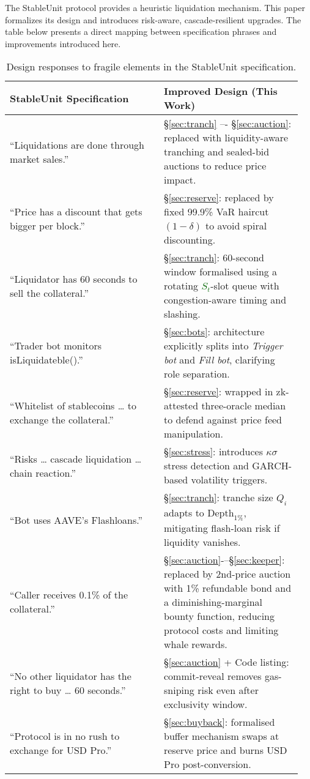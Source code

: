 \documentclass[11pt]{article}
\newcommand{\secref}[1]{\hyperref[#1]{\S\ref*{#1}}}
\begin{document}
The StableUnit protocol \parencite{stableunit2025spec} provides a heuristic liquidation mechanism. This paper formalizes its design and introduces risk-aware, cascade-resilient upgrades. The table below presents a direct mapping between specification phrases and improvements introduced here.
\begin{table}[ht]
\centering
\caption{Design responses to fragile elements in the StableUnit specification.}
\label{tab:trigger-map}

\begin{tabular}{@{}p{0.5\linewidth} p{0.45\linewidth}@{}}
\toprule
\textbf{StableUnit Specification} & \textbf{Improved Design (This Work)} \\
\midrule
“Liquidations are done through market sales.” & \secref{sec:tranch} –- \secref{sec:auction}: replaced with liquidity-aware tranching and sealed-bid auctions to reduce price impact. \\
“Price has a discount that gets bigger per block.” & \secref{sec:reserve}: replaced by fixed 99.9\% VaR haircut $(1 - \delta)$ to avoid spiral discounting. \\
“Liquidator has 60 seconds to sell the collateral.” & \secref{sec:tranch}: 60-second window formalised using a rotating \textcolor{darkgreen}{$S_{t}$}-slot queue with congestion-aware timing and slashing. \\
“Trader bot monitors isLiquidateble().” & \secref{sec:bots}: architecture explicitly splits into \textit{Trigger bot} and \textit{Fill bot}, clarifying role separation. \\
“Whitelist of stablecoins … to exchange the collateral.” & \secref{sec:reserve}: wrapped in zk-attested three-oracle median to defend against price feed manipulation. \\
“Risks … cascade liquidation … chain reaction.” & \secref{sec:stress}: introduces $\kappa\sigma$ stress detection and GARCH-based volatility triggers. \\
“Bot uses AAVE’s Flashloans.” & \secref{sec:tranch}: tranche size $Q_i$ adapts to $\text{Depth}_{1\%}$, mitigating flash-loan risk if liquidity vanishes. \\
“Caller receives 0.1\% of the collateral.” & \secref{sec:auction}-–\secref{sec:keeper}: replaced by 2nd-price auction with 1\% refundable bond and a diminishing-marginal bounty function, reducing protocol costs and limiting whale rewards. \\
“No other liquidator has the right to buy … 60 seconds.” & \secref{sec:auction} + Code listing: commit-reveal removes gas-sniping risk even after exclusivity window. \\
“Protocol is in no rush to exchange for USD Pro.” &  \secref{sec:buyback}: formalised buffer mechanism swaps at reserve price and burns USD Pro post-conversion. \\
\bottomrule
\end{tabular}
\end{table}
\end{document}
